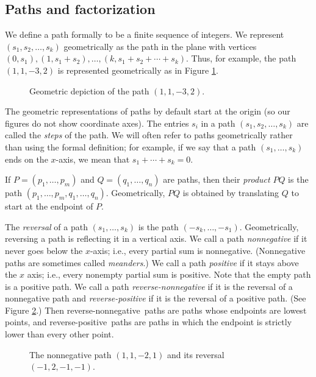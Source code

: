 \documentclass[12pt,reqno, oneside]{amsart}
\newcommand{\rn}{reverse-nonnegative}
\newcommand{\rp}{reverse-positive}
\begin{document}
\subsection{Paths and factorization}

We  define a path formally to be a finite sequence of integers. We represent $(s_1,s_2,\dots, s_k)$ geometrically as the path in the plane with vertices $(0,s_1), (1,s_1+s_2), \dots, (k, s_1+s_2+\cdots +s_k)$. Thus, for example, the path $(1,1,-3,2)$ is represented geometrically as in Figure \ref{f-geom1}.
\begin{figure}[h]
\caption{Geometric depiction of the path $(1,1,-3,2)$.}
\label{f-geom1}
\end{figure}


The geometric representations of paths by default start at the origin (so our figures do not show coordinate axes). The entries $s_i$ in a path $(s_1,s_2,\dots, s_k)$ are called the \emph{steps} of the path. 
We will often refer to paths geometrically rather than using the formal definition; for example, if we say that a path $(s_1, \dots, s_k)$ ends on the $x$-axis, we mean that $s_1+\cdots + s_k=0$.


If $P=(p_1,\dots, p_m)$ and $Q=(q_1,\dots, q_n)$ are paths, then their \emph{product} $PQ$ is the path $(p_1,\dots, p_m, q_1, \dots, q_n)$. Geometrically, $PQ$ is obtained by translating $Q$ to start at the endpoint of $P$.

The \emph{reversal} of a path $(s_1,\dots, s_k)$ is the path $(-s_k, \dots, -s_1)$. Geometrically, reversing a path is reflecting it in a vertical axis.
We call a path \emph{nonnegative} if it never goes below the $x$-axis; i.e.,  every partial sum is nonnegative. (Nonnegative paths are sometimes called \emph{meanders}.) We call a path \emph{positive} if it stays above the $x$ axis; i.e., every nonempty partial sum is positive. Note that the empty path is a positive path.  We call a path \emph{\rn} if it is the reversal of a nonnegative path and \emph{\rp} if it is the reversal of a positive path. (See Figure \ref{f-rev}.) Then \rn\ paths are paths whose endpoints are lowest points, and  \rp\ paths are paths in which the endpoint is strictly lower than every other point.


\begin{figure}[h]
\hskip 30pt
\caption{The nonnegative path $(1,1,-2,1)$ and its reversal $(-1,2,-1,-1)$.}
\label{f-rev}
\end{figure}
\end{document}
